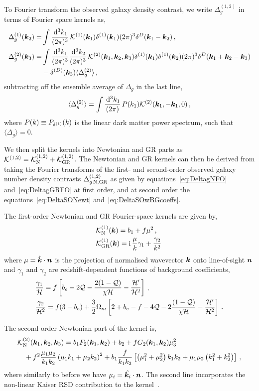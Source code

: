 To Fourier transform the observed galaxy density contrast, we write $\Delta_g^{(1,2)}$ in terms of Fourier space kernels as, 
\begin{align}
	\Delta_g^{(1)}(\bm {k}_2) =& \int \frac{\,\mathrm{d}^3 k_1}{(2\pi)^3}\, \mathcal{K}^{(1)}(\bm {k}_1) \delta^{(1)}(\bm {k}_1) (2\pi)^3 \delta^D(\bm {k}_1-\bm {k}_2)\,,\\
	\Delta_g^{(2)}(\bm {k}_3) =& \int \frac{\,\mathrm{d}^3 k_1}{(2\pi)^3} \frac{\,\mathrm{d}^3 k_2}{(2\pi)^3} \, \mathcal{K}^{(2)}(\bm {k}_1,\bm {k}_2,\bm {k}_3) \delta^{(1)}(\bm {k}_1) \delta^{(1)}(\bm {k}_2) (2\pi)^3 \delta^D(\bm {k}_1+\bm {k}_2-\bm {k}_3)\nonumber \\
	& - \delta^{(D)}(\bm {k}_3) \langle \Delta_g^{(2)} \rangle\,,
\end{align}
subtracting off the ensemble average of $\Delta_g$ in the last line, 
\begin{equation}
	\langle \Delta_g^{(2)} \rangle = \int \frac{\,\mathrm{d}^3 k_1}{(2\pi)}\, P(k_1) \mathcal{K}^{(2)}(\bm {k}_1, -\bm {k}_1,0)\,,
\end{equation}
where $P(k) \equiv P_{\delta^{(1)}}(k)$ is the linear dark matter power spectrum, such that $\langle \Delta_g \rangle = 0$. 

We then split the kernels into Newtonian and GR parts as $\mathcal{K}^{(1,2)} = \mathcal{K}_{\mathrm{N}}^{(1,2)} + \mathcal{K}_{\mathrm{GR}}^{(1,2)}$. The Newtonian and GR kernels can then be derived from taking the Fourier transforms of the first- and second-order observed galaxy number density contrasts $\Delta_{g\,\mathrm{N},\mathrm{GR}}^{(1,2)}$ as given by equations~\eqref{eq:DeltagNFO} and~\eqref{eq:DeltagGRFO} at first order, and at second order the equations~\eqref{eq:DeltaSONewt} and~\eqref{eq:DeltaSOwBGcoeffs}. 

The first-order Newtonian and GR Fourier-space kernels are given by, 
\begin{align}
	&\mathcal{K}^{(1)}_{\mathrm{N}}(\bm {k}) = b_1 + f \mu^2\,,\\
	&\mathcal{K}^{(1)}_{\mathrm{GR}}(\bm {k}) = \mathrm{i\,} \frac{\mu}{k}\gamma_1 + \frac{\gamma_2}{k^2}\,
\end{align}
where $\mu = \hat{\bm {k}}\cdot\bm {n}$ is the projection of normalised wavevector $\bm {k}$ onto line-of-sight $\bm {n}$\, and $\gamma_1$ and $\gamma_2$ are redshift-dependent functions of background coefficients, 
\begin{align}
	&\frac{\gamma_1}{\mathcal{H}} = f \left[ b_e - 2 \mathcal{Q} - \frac{2 (1 - \mathcal{Q})}{\chi \mathcal{H}}  - \frac{\mathcal{H}'}{\mathcal{H}^2} \right]\,,\\
	&\frac{\gamma_2}{\mathcal{H}^2} = f (3 - b_e) + \frac{3}{2} \Omega_m \left[ 2 + b_e - f - 4 \mathcal{Q} - 2 \frac{(1 - \mathcal{Q})}{\chi \mathcal{H}} - \frac{\mathcal{H}'}{\mathcal{H}^2} \right]\,. 
\end{align}

The second-order Newtonian part of the kernel is,
\begin{align}
	&\mathcal{K}_{\mathrm{N}}^{(2)}(\bm {k}_1,\bm {k}_2,\bm {k}_3) = b_1 F_2(\bm {k}_1,\bm {k}_2) + b_2 + f G_2 (\bm {k}_1,\bm {k}_2) \mu_3^2 \nonumber \\
	&\quad+f^2 \frac{\mu_1 \mu_2}{k_1 k_2} \left( \mu_1 k_1 + \mu_2 k_2 \right)^2 + b_1 \frac{f}{k_1 k_2} \left[ \left( \mu_1^2 + \mu_2^2 \right)k_1 k_2 + \mu_1 \mu_2 \left( k_1^2 + k_2^2 \right) \right]\,,
\end{align}
where similarly to before we have $\mu_i = \hat{\bm {k}_i}\cdot\bm {n}$. The second line incorporates the non-linear Kaiser RSD contribution to the kernel~\cite{Verde:1999ij,Scoccimarro:1999ed}. 


